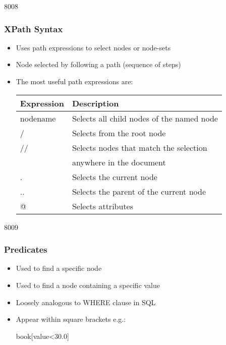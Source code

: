 \begin{slide}[fragile]{8008}
\frametitle{XPath Syntax}
\begin{itemize}
\item Uses path expressions to select nodes or node-sets
\item Node selected by following a path (sequence of steps)
\item The most useful path expressions are:
\begin{center}
\begin{tabular}{|l|l|}
\hline
\textbf{Expression}  & \textbf{Description} \\ \hline
nodename    & Selects all child nodes of the named node \\ \hline
/           & Selects from the root node \\ \hline
//          & Selects nodes that match the selection \\
            & anywhere in the document \\ \hline
.           & Selects the current node \\ \hline
..          & Selects the parent of the current node \\ \hline
@           & Selects attributes \\ \hline
\end{tabular}
\end{center}
\end{itemize}
\end{slide}


\begin{slide}[fragile]{8009}
\frametitle{Predicates}
\begin{itemize}
\item Used to find a specific node
\item Used to find a node containing a specific value
\item Loosely analogous to WHERE clause in SQL
\item Appear within square brackets e.g.:
\vspace{8pt}
\begin{xml}
 book[value<30.0]
\end{xml}
\end{itemize}
\end{slide}


